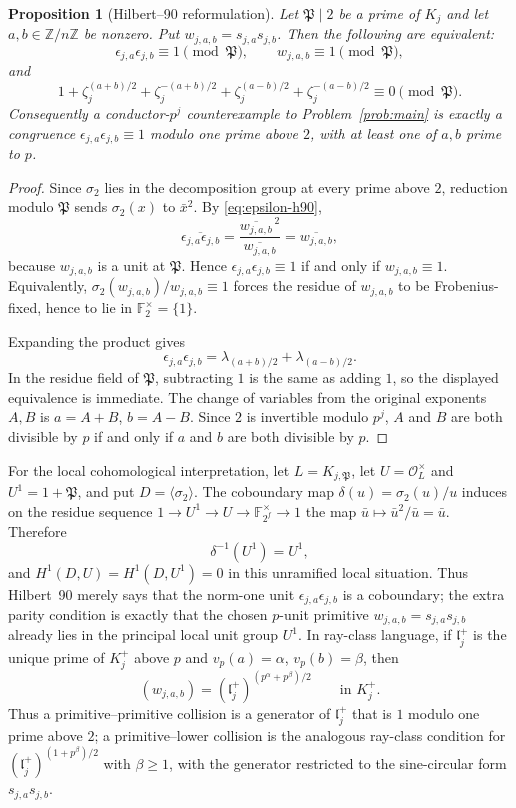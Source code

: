 \documentclass[a4paper]{article}
\newtheorem{proposition}[theorem]{Proposition}
\newcommand{\F}{\mathbb{F}}
\newcommand{\Z}{\mathbb{Z}}
\begin{document}
\begin{proposition}[Hilbert--90 reformulation]\label{prop:epsilon-reform}
	Let $\mathfrak{P}\mid2$ be a prime of $K_j$ and let
	$a,b\in\Z/n\Z$ be nonzero.  Put
	$w_{j,a,b}=s_{j,a}s_{j,b}$.  Then the following are equivalent:
	\[
		\epsilon_{j,a}\epsilon_{j,b}\equiv1\pmod{\mathfrak{P}},
		\qquad
		w_{j,a,b}\equiv1\pmod{\mathfrak{P}},
	\]
	and
	\[
		1+\zeta_j^{(a+b)/2}+\zeta_j^{-(a+b)/2}
		 +\zeta_j^{(a-b)/2}+\zeta_j^{-(a-b)/2}
		\equiv0\pmod{\mathfrak{P}} .
	\]
	Consequently a conductor-$p^j$ counterexample to
	Problem~\ref{prob:main} is exactly a congruence
	$\epsilon_{j,a}\epsilon_{j,b}\equiv1$ modulo one prime above $2$,
	with at least one of $a,b$ prime to $p$.
\end{proposition}

\begin{proof}
	Since $\sigma_2$ lies in the decomposition group at every prime above
	$2$, reduction modulo $\mathfrak P$ sends $\sigma_2(x)$ to
	$\bar x^2$.  By \eqref{eq:epsilon-h90},
	\[
		\overline{\epsilon_{j,a}\epsilon_{j,b}}
		=\frac{\overline{w_{j,a,b}}^{\,2}}{\overline{w_{j,a,b}}}
		=\overline{w_{j,a,b}},
	\]
	because $w_{j,a,b}$ is a unit at $\mathfrak P$.  Hence
	$\epsilon_{j,a}\epsilon_{j,b}\equiv1$ if and only if
	$w_{j,a,b}\equiv1$.  Equivalently,
	$\sigma_2(w_{j,a,b})/w_{j,a,b}\equiv1$ forces the residue of
	$w_{j,a,b}$ to be Frobenius-fixed, hence to lie in
	$\F_2^\times=\{1\}$.

	Expanding the product gives
	\[
		\epsilon_{j,a}\epsilon_{j,b}
		=\lambda_{(a+b)/2}+\lambda_{(a-b)/2}.
	\]
	In the residue field of $\mathfrak{P}$, subtracting $1$ is the same as
	adding $1$, so the displayed equivalence is immediate.  The change of
	variables from the original exponents $A,B$ is
	$a=A+B$, $b=A-B$.  Since $2$ is invertible modulo $p^j$, $A$ and $B$
	are both divisible by $p$ if and only if $a$ and $b$ are both divisible
	by $p$.
\end{proof}

For the local cohomological interpretation, let
$L=K_{j,\mathfrak P}$, let $U=\mathcal O_L^\times$ and
$U^1=1+\mathfrak P$, and put $D=\langle\sigma_2\rangle$.
The coboundary map $\delta(u)=\sigma_2(u)/u$ induces on the residue
sequence $1\to U^1\to U\to\F_{2^f}^\times\to1$ the map
$\bar u\mapsto\bar u^2/\bar u=\bar u$.  Therefore
\[
	\delta^{-1}(U^1)=U^1,
\]
and $H^1(D,U)=H^1(D,U^1)=0$ in this unramified local situation.  Thus
Hilbert~90 merely says that the norm-one unit
$\epsilon_{j,a}\epsilon_{j,b}$ is a coboundary; the extra parity
condition is exactly that the chosen $p$-unit primitive
$w_{j,a,b}=s_{j,a}s_{j,b}$ already lies in the principal local unit group
$U^1$.  In ray-class language, if $\mathfrak l_j^+$ is the unique prime
of $K_j^+$ above $p$ and $v_p(a)=\alpha$, $v_p(b)=\beta$, then
\[
	(w_{j,a,b})=(\mathfrak l_j^+)^{(p^\alpha+p^\beta)/2}
	\qquad\text{in }K_j^+.
\]
Thus a primitive--primitive collision is a generator of
$\mathfrak l_j^+$ that is $1$ modulo one prime above $2$; a
primitive--lower collision is the analogous ray-class condition for
$(\mathfrak l_j^+)^{(1+p^\beta)/2}$ with $\beta\geq1$, with the
generator restricted to the sine-circular form $s_{j,a}s_{j,b}$.
\end{document}
